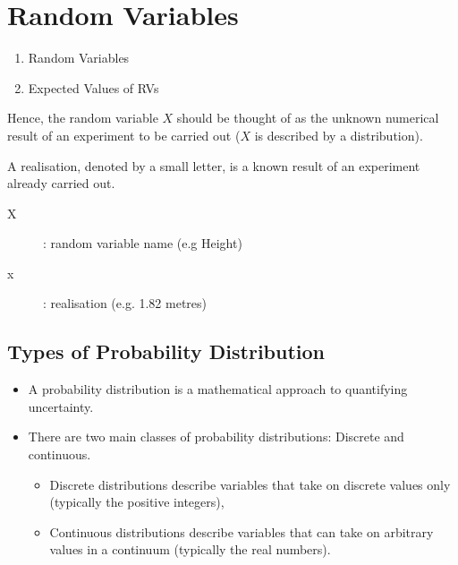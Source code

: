 \documentclass[]{report}
\begin{document}



\section{Random Variables}
\begin{enumerate}
\item Random Variables
\item Expected Values of RVs
\end{enumerate}
{
Hence, the random variable $X$ should be thought of as the
unknown numerical result of an experiment to be carried out ($X$ is
described by a distribution).

A realisation, denoted by a small letter, is a known result of an
experiment already carried out.


\begin{description}
\item[X] : random variable name (e.g Height)
\item[x] : realisation (e.g. 1.82 metres) 
\end{description}



\subsection{Types of Probability Distribution}
\begin{itemize}
\item A probability distribution is a mathematical approach to quantifying uncertainty.

\item There are two main classes of probability distributions: Discrete and continuous. 

\begin{itemize}
\item Discrete distributions describe variables that take on discrete values only (typically the positive integers), 
\item Continuous distributions describe variables that can take on arbitrary values in a continuum (typically the real numbers).
\end{itemize}


\end{itemize}






}
\end{document}
